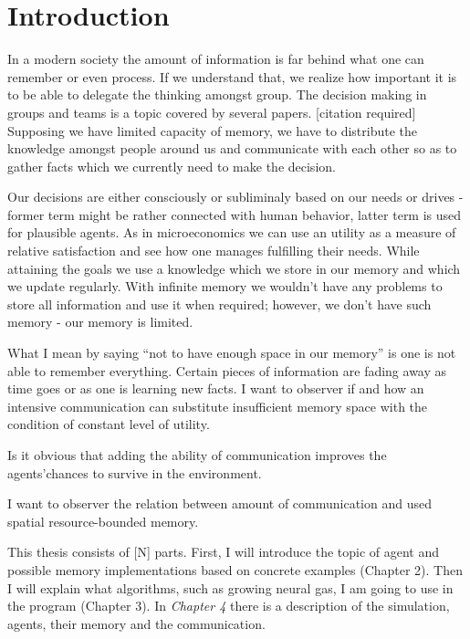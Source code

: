 \chapter{Introduction}

In a modern society the amount of information is far behind what one can remember or even process. If we understand that, we realize how important it is to be able to delegate the thinking amongst group. The decision making in groups and teams is a topic covered by several papers. [citation required] Supposing we have limited capacity of memory, we have to distribute the knowledge amongst people around us and communicate with each other so as to gather facts which we currently need to make the decision. 

Our decisions are either consciously or subliminaly based on our needs or drives - former term might be rather connected with human behavior, latter term is used for plausible agents. As in microeconomics we can use an utility as a measure of relative satisfaction \cite{Varian:micro} and see how one manages fulfilling their needs. While attaining the goals we use a knowledge which we store in our memory and which we update regularly. With infinite memory we wouldn’t have any problems to store all information and use it when required; however, we don’t have such memory - our memory is limited. 

What I mean by saying “not to have enough space in our memory” is one is not able to remember everything. Certain pieces of information are fading away as time goes or as one is learning new facts. I want to observer if and how an intensive communication can substitute insufficient memory space with the condition of constant level of utility.

Is it obvious that adding the ability of communication improves the agents'chances to survive in the environment.

I want to observer the relation between amount of communication and used spatial resource-bounded memory. 

This thesis consists of [N] parts. First, I will introduce the topic of agent and possible memory implementations based on concrete examples (Chapter 2). Then I will explain what algorithms, such as growing neural gas, I am going to use in the program (Chapter 3). In \emph{Chapter 4} there is a description of the simulation, agents, their memory and the communication.